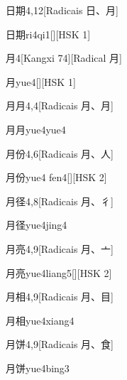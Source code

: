 \begin{entry}{日期}{4,12}[Radicais ⽇、⽉]
  \begin{phonetics}{日期}{ri4qi1}[][HSK 1]
  \end{phonetics}
\end{entry}

\begin{entry}{月}{4}[Kangxi 74][Radical ⽉]
  \begin{phonetics}{月}{yue4}[][HSK 1]
  \end{phonetics}
\end{entry}

\begin{entry}{月月}{4,4}[Radicais ⽉、⽉]
  \begin{phonetics}{月月}{yue4yue4}
  \end{phonetics}
\end{entry}

\begin{entry}{月份}{4,6}[Radicais ⽉、⼈]
  \begin{phonetics}{月份}{yue4 fen4}[][HSK 2]
  \end{phonetics}
\end{entry}

\begin{entry}{月径}{4,8}[Radicais ⽉、⼻]
  \begin{phonetics}{月径}{yue4jing4}
  \end{phonetics}
\end{entry}

\begin{entry}{月亮}{4,9}[Radicais ⽉、⼇]
  \begin{phonetics}{月亮}{yue4liang5}[][HSK 2]
  \end{phonetics}
\end{entry}

\begin{entry}{月相}{4,9}[Radicais ⽉、⽬]
  \begin{phonetics}{月相}{yue4xiang4}
  \end{phonetics}
\end{entry}

\begin{entry}{月饼}{4,9}[Radicais ⽉、⾷]
  \begin{phonetics}{月饼}{yue4bing3}
  \end{phonetics}
\end{entry}


